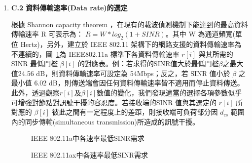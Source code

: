 \documentclass[12pt,a4paper]{article}
\newcommand{\Fig}[1]{圖~\ref{#1}}
\begin{document}
\begin{description}
\begin{enumerate}
\item [\bf ]{\textbf{\Kai C.2 資料傳輸速率(Data rate)的選定 }}\\
\vspace{-2mm}

根據 Shannon capacity theorem \cite{book2002_wc}，在現有的載波偵測機制下能達到的最高資料傳輸速率 R 可表示為： $R = W*log_{2}(1+SINR)$。其中 W 為通道頻寬(單位 Hertz)，另外，建立於 IEEE 802.11 架構下的網路支援的資料傳輸速率為不連續的，\Fig{fig:sinr_thre}為 IEEE802.11a 標準\cite{ieee802.11a}下各資料傳輸速率 $r[i]$ 與其所需的 SINR 最低門檻 $\beta[i]$ 的對應表。例：若求得的SINR值大於最低門檻$\beta$之最大值24.56 dB，則資料傳輸速率可設定為 54Mbps；反之，若 SINR 值小於 $\beta$ 之最小值 6.02 dB，則傳送端會因任何資料傳輸速率皆不適用而停止資料傳送。此外，透過觀察$r[i]$及$\beta[i]$數值的變化，我們發現適當的選擇各項參數似乎可增強對節點對訊號干擾的容忍度。若接收端的SINR 值與其選定的 $r[i]$ 所對應的 $\beta[i]$ 彼此之間有一定程度上的差距，則接收端可負荷部分因 $d_{cs}$ 範圍內的同步傳輸(simultaneous transmission)所造成的訊號干擾。 \\

\begin{figure}[hbt]
\begin{center}
\caption{IEEE 802.11a中各速率最低SINR需求} \label{fig:sinr_thre}
\vspace{-0.2cm}
\end{center}
\end{figure}

\begin{figure}[hbt]
\begin{center}
\caption{IEEE 802.11ax中各速率最低SINR需求} \label{fig:IEEE802.11ax_SINR_rate}
\vspace{-0.2cm}
\end{center}
\end{figure}


\end{enumerate}
\end{description}
\end{document}
